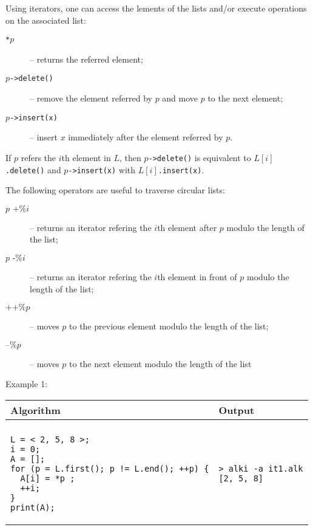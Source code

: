 \documentclass[a4paper]{report}
\begin{document}
Using iterators, one can access the lements of the lists and/or execute operations on the associated list:
\begin{description}
\item[\texttt{*}$p$]  -- returns the referred element;
\item[$p$\texttt{->delete()}] -- remove the element referred by $p$ and move $p$ to the next element;
\item[$p$\texttt{->insert(x)}] -- insert $x$ immediately after the element referred by $p$.
\end{description}

If $p$ refers the $i$th element in $L$, then $p$\texttt{->delete()} is equivalent to $L[i]$\texttt{.delete()} and $p$\texttt{->insert(x)} with $L[i]$\texttt{.insert(x)}.


The following operators are useful to traverse circular lists:
\begin{description}
\item[$p\texttt{ +\% }i$] -- returns an iterator refering the $i$th element after $p$ modulo the length of the list;
\item[$p\texttt{ -\% }i$] -- returns an iterator refering the $i$th element in front of $p$ modulo the length of the list;
\item[$\texttt{++\%}p$] -- moves $p$ to the previous element modulo the length of the list;
\item[$\texttt{--\%}p$] -- moves $p$ to the next element modulo the length of the list
\end{description}

Example 1:
\begin{center}
\begin{tabular}{ll}
Algorithm & Output\\
\hline
\\
\begin{minipage}{.45\textwidth}
\begin{verbatim}
L = < 2, 5, 8 >;
i = 0;
A = [];
for (p = L.first(); p != L.end(); ++p) {
  A[i] = *p ;
  ++i;
}
print(A);
\end{verbatim}
\end{minipage}
&
\begin{minipage}{.45\textwidth}
\begin{verbatim}
> alki -a it1.alk
[2, 5, 8]
\end{verbatim}
\end{minipage}
\end{tabular}
\end{center}
\end{document}
